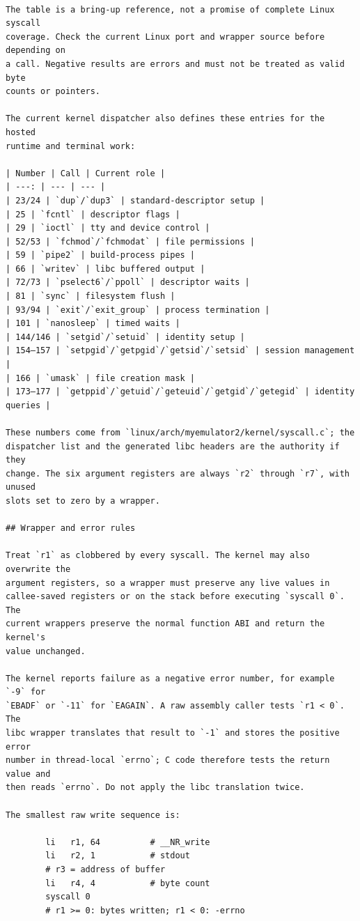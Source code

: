 \documentclass[
  oneside,
  openany]{book}
\begin{document}
\begin{verbatim}

The table is a bring-up reference, not a promise of complete Linux syscall
coverage. Check the current Linux port and wrapper source before depending on
a call. Negative results are errors and must not be treated as valid byte
counts or pointers.

The current kernel dispatcher also defines these entries for the hosted
runtime and terminal work:

| Number | Call | Current role |
| ---: | --- | --- |
| 23/24 | `dup`/`dup3` | standard-descriptor setup |
| 25 | `fcntl` | descriptor flags |
| 29 | `ioctl` | tty and device control |
| 52/53 | `fchmod`/`fchmodat` | file permissions |
| 59 | `pipe2` | build-process pipes |
| 66 | `writev` | libc buffered output |
| 72/73 | `pselect6`/`ppoll` | descriptor waits |
| 81 | `sync` | filesystem flush |
| 93/94 | `exit`/`exit_group` | process termination |
| 101 | `nanosleep` | timed waits |
| 144/146 | `setgid`/`setuid` | identity setup |
| 154–157 | `setpgid`/`getpgid`/`getsid`/`setsid` | session management |
| 166 | `umask` | file creation mask |
| 173–177 | `getppid`/`getuid`/`geteuid`/`getgid`/`getegid` | identity queries |

These numbers come from `linux/arch/myemulator2/kernel/syscall.c`; the
dispatcher list and the generated libc headers are the authority if they
change. The six argument registers are always `r2` through `r7`, with unused
slots set to zero by a wrapper.

## Wrapper and error rules

Treat `r1` as clobbered by every syscall. The kernel may also overwrite the
argument registers, so a wrapper must preserve any live values in
callee-saved registers or on the stack before executing `syscall 0`. The
current wrappers preserve the normal function ABI and return the kernel's
value unchanged.

The kernel reports failure as a negative error number, for example `-9` for
`EBADF` or `-11` for `EAGAIN`. A raw assembly caller tests `r1 < 0`. The
libc wrapper translates that result to `-1` and stores the positive error
number in thread-local `errno`; C code therefore tests the return value and
then reads `errno`. Do not apply the libc translation twice.

The smallest raw write sequence is:

        li   r1, 64          # __NR_write
        li   r2, 1           # stdout
        # r3 = address of buffer
        li   r4, 4           # byte count
        syscall 0
        # r1 >= 0: bytes written; r1 < 0: -errno
\end{verbatim}
\end{document}
